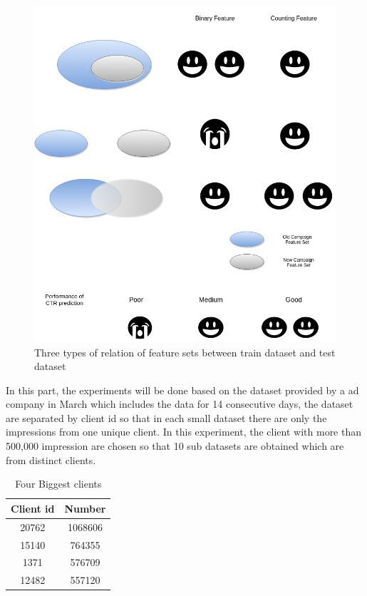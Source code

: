 \begin{figure}[h]
\centering
\includegraphics[width=\columnwidth]{bias.png}
\caption{Three types of relation of feature sets between train dataset and test dataset}
\label{fig:datasetbias}
\end{figure}

In this part, the experiments will be done based on the dataset provided by a ad company in March which includes the data for 14 consecutive days, the dataset are separated by client id so that in each small dataset there are only the impressions from one unique client. In this experiment, the client with more than 500,000 impression are chosen so that 10 sub datasets are obtained which are from distinct clients. 


\iffalse
\begin{table}[t]
 \centering
 \begin{tabular}{ ||c c || } 
 \hline
 Client id  & Number \\
 \hline
 20762 & 1068606 \\ 
  15140 & 764355 \\ 
   1371 & 576709 \\ 
   12482 & 557120\\
 \hline
 \end{tabular}
 \caption{Four Biggest clients}
 \label{tab:campainid}
 \end{table}
 
